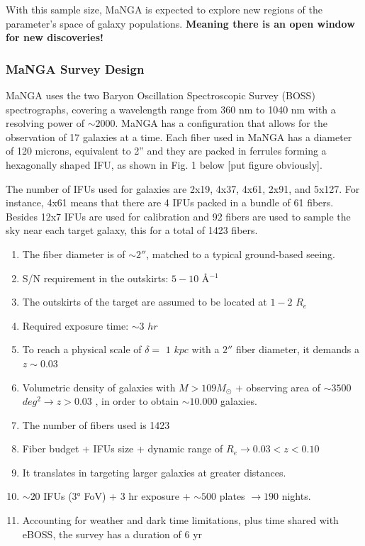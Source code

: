 With this sample size, MaNGA is expected to explore new regions of the parameter's space of galaxy populations. \textbf{Meaning there is an open window for new discoveries!}


\subsubsection*{MaNGA Survey Design}

 MaNGA uses the two Baryon Oscillation Spectroscopic Survey (BOSS) spectrographs, covering a wavelength range from 360 nm to 1040 nm with a resolving power of $\sim 2000$. MaNGA has a configuration that allows for the observation of 17 galaxies at a time. Each fiber used in MaNGA has a diameter of 120 microns, equivalent to 2'' and they are packed in ferrules forming a hexagonally shaped IFU, as shown in Fig. 1 below [put figure obviously].

The number of IFUs used for galaxies are 2x19, 4x37, 4x61, 2x91, and 5x127. For instance, 4x61 means that there are 4 IFUs packed in a bundle of 61 fibers. Besides 12x7 IFUs are used for calibration and 92 fibers are used to sample the sky near each target galaxy, this for a total of 1423 fibers. 

\begin{enumerate}
  
  \item The fiber diameter is of $\sim 2''$, matched to a typical ground-based seeing.
  
  \item S/N requirement in the outskirts: $5-10$ \AA$^{-1}$
  
  \item The outskirts of the target are assumed to be located at $1-2$ $R_e$
  
  \item Required exposure time: $\sim 3$ $hr$

  \item To reach a physical scale of $\delta =$ $1$ $kpc$ with a $2''$ fiber diameter, it demands a $z \sim  0.03$
  
  \item Volumetric density of galaxies with $M > 109 M_{\odot}$ $+$ observing area of $\sim 3500$ $deg^2 \rightarrow z > 0.03$  , in order to obtain  $\sim 10.000$ galaxies.
  
  \item The number of fibers used is 1423
  
  \item Fiber budget + IFUs size + dynamic range of $R_e \rightarrow 0.03 < z < 0.10$
  
  \item It translates in targeting larger galaxies at greater distances.
  
  \item $ \sim 20$ IFUs ($3°$ FoV) + $3$ hr exposure + $ \sim 500$ plates $\rightarrow 190$ nights.
  
  \item Accounting for weather and dark time limitations, plus time shared with eBOSS, the survey has a duration of 6 yr
\end{enumerate}

